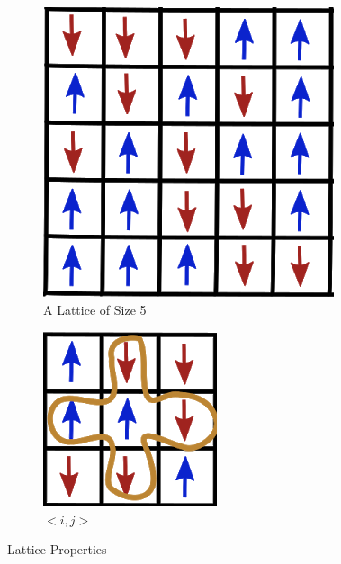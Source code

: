 \documentclass[a4paper]{article}
\begin{document}
\begin{figure}[h]
\centering
\begin{subfigure}{0.3\textwidth}
\includegraphics[width=1\linewidth]{lattice.png} 
\caption{A Lattice of Size 5}
\label{fig:subim1}
\end{subfigure}
\hspace{1cm}
\begin{subfigure}{0.2\textwidth}
\includegraphics[width=1.1\linewidth]{nearestneighbours.png}
\vspace{0.6cm}
\caption{$<i, j>$}
\label{fig:subim2}
\end{subfigure}
\caption{Lattice Properties}
\label{fig:image2}
\end{figure}
\end{document}
